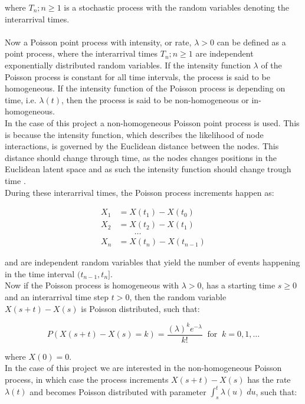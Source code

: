 where ${T_n ; n \ge 1}$ is a stochastic process with the random variables denoting the interarrival times.
\\\\
Now a Poisson point process with intensity, or rate, $\lambda > 0$ can be defined as a point process, where the interarrival times ${T_n ; n \ge 1}$ are independent exponentially distributed random variables. 
If the intensity function $\lambda$ of the Poisson process is constant for all time intervals, the process is said to be homogeneous. 
If the intensity function of the Poisson process is depending on time, i.e. $\lambda(t)$, then the process is said to be non-homogeneous or in-homogeneous.
\\
In the case of this project a non-homogeneous Poisson point process is used. 
This is because the intensity function, which describes the likelihood of node interactions, is governed by the Euclidean distance between the nodes. 
This distance should change through time, as the nodes changes positions in the Euclidean latent space and as such the intensity function should change trough time \cite{Bas2019AProcess}.
\\
During these interarrival times, the Poisson process increments happen as:

\begin{align*}
X_1 &= X(t_1) - X(t_0) \\
X_2 &= X(t_2) - X(t_1) \\
&\;\;\;\;\;\;\;\dots \\
X_n &= X(t_n) - X(t_{n-1})
\end{align*}

and are independent random variables that yield the number of events happening in the time interval $(t_{n-1}, t_n]$. 
\\
Now if the Poisson process is homogeneous with $\lambda > 0$, has a starting time $s \ge 0$ and an interarrival time step $t > 0$, then the random variable $X(s+t) - X(s)$ is Poisson distributed, such that:

\begin{equation}
    P(X(s+t) - X(s) = k) = \frac{(\lambda)^k e^{-\lambda}}{k!} \;\; \text{for} \;\; k=0,1,\dots
\end{equation}

where $X(0) = 0$.
\\
In the case of this project we are interested in the non-homogeneous Poisson process, in which case the process increments $X(s+t) - X(s)$ has the rate $\lambda(t)$ and becomes Poisson distributed with parameter $\int_s^t \lambda(u)\; du$, such that:

